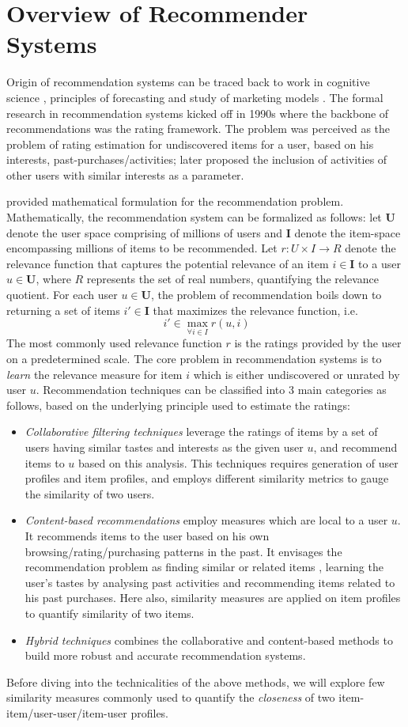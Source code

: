 \section{Overview of Recommender Systems}
Origin of recommendation systems can be traced back to work in cognitive science \cite{rich:user}, principles of forecasting \cite{armstrong:forecasting} and study of marketing models \cite{lilien:marketing}. The formal research in recommendation systems kicked off in 1990s where the backbone of recommendations was the rating framework. The problem was perceived as the problem of rating estimation for undiscovered items for a user, based on his interests, past-purchases/activities; later \cite{goldberg:collaborative} proposed the inclusion of activities of other users with similar interests as a parameter.

\cite{hill:virtual} provided mathematical formulation for the recommendation problem. Mathematically, the recommendation system can be formalized as follows: let $\textbf{U}$ denote the user space comprising of millions of users and $\textbf{I}$ denote the item-space encompassing millions of items to be recommended. Let $r:U\times I\rightarrow R$ denote the relevance function that captures the potential relevance of an item $i\in \textbf{I}$ to a user $u\in \textbf{U}$, where $R$ represents the set of real numbers, quantifying the relevance quotient. For each user $u\in \textbf{U}$, the problem of recommendation boils down to returning a set of items $i'\in \textbf{I}$ that maximizes the relevance function, i.e.
\begin{equation}
~i'\in\max_{\forall i\in I}r(u,i)
\end{equation}
The most commonly used relevance function $r$ is the ratings provided by the user on a predetermined scale. The core problem in recommendation systems is to \textit{learn} the relevance measure for item $i$ which is either undiscovered or unrated by user $u$. Recommendation techniques can be classified into 3 main categories as follows, based on the underlying principle used to estimate the ratings:
\begin{itemize}
\item \textit{Collaborative filtering techniques} leverage the ratings of items by a set of users having similar tastes and interests as the given user $u$, and recommend items to $u$ based on this analysis. This techniques requires generation of user profiles and item profiles, and employs different similarity metrics to gauge the similarity of two users. 
\item \textit{Content-based recommendations} employ measures which are local to a user $u$. It recommends items to the user based on his own browsing/rating/purchasing patterns in the past. It envisages the recommendation problem as finding similar or related items \cite{almazro:survey}, learning the user's tastes by analysing past activities and recommending items related to his past purchases. Here also, similarity measures are applied on item profiles to quantify similarity of two items.
\item \textit{Hybrid techniques} combines the collaborative and content-based methods to build more robust and accurate recommendation systems.
\end{itemize}
Before diving into the technicalities of the above methods, we will explore few similarity measures commonly used to quantify the \textit{closeness} of two item-item/user-user/item-user profiles.